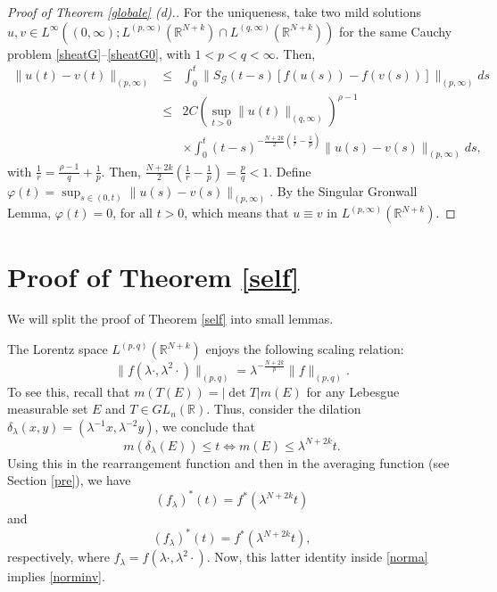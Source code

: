 \documentclass[12pt]{amsart}
\newcommand{\R}{\mathbb{R}}
\begin{document}
\begin{proof}[Proof of Theorem \ref{globale} (d).] For the uniqueness, take two mild solutions $u,v \in L^\infty((0,\infty); L^{(p,\infty)}(\R^{N+k}) \cap L^{(q,\infty)}(\R^{N+k}))$ for the same Cauchy problem \eqref{sheatG}--\eqref{sheatG0}, with $1<p<q<\infty$. Then,
	\begin{eqnarray*}
		\|u(t) - v(t)\|_{(p,\infty)} & \leq & \int_0^t \| S_\mathcal{G}(t-s) [f(u(s)) - f(v(s))] \| _{(p,\infty)} ds \\
		& \leq & 2C \left(\sup_{t>0} \| u(t) \|_{(q,\infty)}\right)^{\rho-1} \\
		&& \times \int_0^t (t-s)^{-\frac{N+2k}{2}(\frac{1}{r} - \frac{1}{p})}  \|u(s) - v(s) \| _{(p,\infty)} ds ,
	\end{eqnarray*}
	with $\frac{1}{r} = \frac{\rho-1}{q} + \frac{1}{p}$. Then, $\frac{N+2k}{2}(\frac{1}{r} - \frac{1}{p})=\frac{p}{q}<1$. Define $\varphi(t) = \sup_{s\in(0,t)} \|u(s) - v(s)\|_{(p,\infty)}$. By the Singular Gronwall Lemma, $\varphi(t)=0$, for all $t>0$, which means that $u\equiv  v$ in $L^{(p,\infty)}(\R^{N+k})$.
	
\end{proof}


\section{Proof of Theorem \ref{self}} \label{proofsym}


We will split the proof of Theorem \ref{self} into small lemmas.


The Lorentz space $L^{(p,q)}(\R^{N+k})$ enjoys the following scaling relation:
\begin{equation}\label{norminv}
	\|f(\lambda \cdot, \lambda^2\cdot)\|_{(p,q)} = \lambda^{-\frac{N+2k}{p}}\|f\|_{(p,q)} .
\end{equation}
To see this, recall that $m(T(E)) = |\det T| m(E)$ for any Lebesgue measurable set $E$ and $T\in GL_n(\R)$. Thus, consider the dilation $\delta_\lambda(x,y) = (\lambda^{-1}x, \lambda^{-2}y)$, we conclude that 
$$m(\delta_\lambda(E))\leq t \iff m(E)\leq \lambda^{N+2k}t .$$ 
Using this in the rearrangement function and then in the averaging function (see Section \ref{pre}), we have 
$$ (f_\lambda)^*(t) = f^*(\lambda^{N+2k}t)$$
and
$$(f_\lambda)^*(t) = f^*(\lambda^{N+2k}t) ,$$
respectively, where $f_\lambda  = f(\lambda \cdot, \lambda^2\cdot)$. Now, this latter identity inside \eqref{norma} implies \eqref{norminv}.
\end{document}

